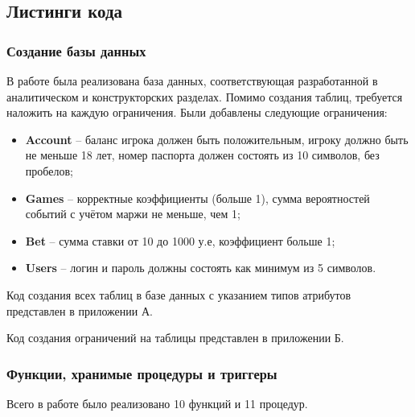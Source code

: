 \subsection{Листинги кода}

\subsubsection{Создание базы данных}
В работе была реализована база данных, соответствующая разработанной в аналитическом и конструкторских разделах.
Помимо создания таблиц, требуется наложить на каждую ограничения.
Были добавлены следующие ограничения:
\begin{itemize}
	\item \textbf{Account} -- баланс игрока должен быть положительным, игроку должно быть не меньше 18 лет, номер паспорта должен состоять из 10 символов, без пробелов;
	\item \textbf{Games} -- корректные коэффициенты (больше 1), сумма вероятностей событий с учётом маржи не меньше, чем 1;
	\item \textbf{Bet} -- сумма ставки от 10 до 1000 у.е, коэффициент больше 1;
	\item \textbf{Users} -- логин и пароль должны состоять как минимум из 5 символов.
\end{itemize} 

Код создания всех таблиц в базе данных с указанием типов атрибутов представлен в приложении А.

Код создания ограничений на таблицы представлен в приложении Б.

\subsubsection{Функции, хранимые процедуры и триггеры}
Всего в работе было реализовано 10 функций и 11 процедур.


